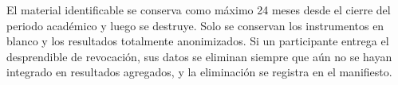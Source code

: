El material identificable se conserva como máximo 24 meses desde el cierre del periodo académico y luego se destruye. Solo se conservan los instrumentos en blanco y los resultados totalmente anonimizados. Si un participante entrega el desprendible de revocación, sus datos se eliminan siempre que aún no se hayan integrado en resultados agregados, y la eliminación se registra en el manifiesto.

